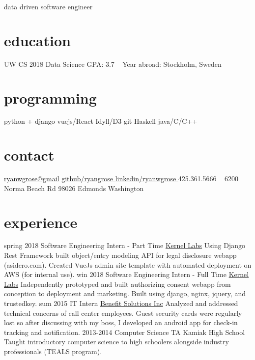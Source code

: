 \documentclass[]{friggeri-cv}
\begin{document}
       {data driven software engineer}


\begin{aside}
  \section{education}
    UW CS 2018
    Data Science
    GPA: 3.7
    ~
    Year abroad:
    Stockholm, Sweden
  \section{programming}
    python + django
    vuejs/React
    Idyll/D3
    git
    Haskell
    java/C/C++
  \section{contact}
    \href{mailto:ryanwgrose@gmail.com}{ryanwgrose@gmail\faEnvelope}
    \href{https://www.github.com/ryangrose}{github/ryangrose \faGithub}
    \href{https://www.linkedin.com/in/ryanwgrose}{linkedin/ryanwgrose \faLinkedin}
    425.361.5666 \faPhone
    ~
    6200 Norma Beach Rd
    98026 Edmonds
    Washington
\end{aside}



\section{experience}

\begin{entrylist}
  \entry
    {spring 2018}
    {Software Engineering Intern - Part Time}
    {\href{http://www.kernellabs.io/}{Kernel Labs}}
    {Using Django Rest Framework built object/entry modeling API for legal disclosure webapp (asidero.com). Created VueJs admin site template with automated deployment on AWS (for internal use).}
  \entry
    {win 2018}
    {Software Engineering Intern - Full Time}
    {\href{http://www.kernellabs.io/}{Kernel Labs}}
    {Independently prototyped and built authorizing consent webapp from conception to deployment and marketing. Built using django, nginx, jquery, and trustedkey.}
  \entry
    {sum 2015}
    {IT Intern}
    {\href{http://www.bsitpa.com/}{Benefit Solutions Inc}}
    {Analyzed and addressed technical concerns of call center employees. Guest security cards were regularly lost so after discussing with my boss, I developed an android app for check-in tracking and notification.}
  \entry
    {2013-2014}
    {Computer Science TA}
    {Kamiak High School}
    {Taught introductory computer science to high schoolers alongside industry professionals (TEALS program).}
\end{entrylist}
\end{document}
